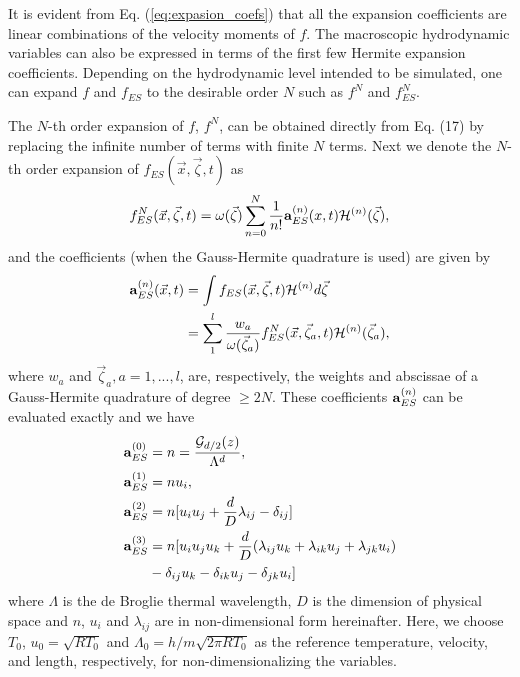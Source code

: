 \documentclass[doublecol]{epl2}
\begin{document}
It is evident from Eq. (\ref{eq:expasion_coefs}) that all the expansion coefficients are linear combinations of the velocity moments of $f$.  The macroscopic hydrodynamic variables can also be expressed in terms of the first few Hermite expansion coefficients.  Depending on the hydrodynamic level intended to be simulated, one can expand $f$ and $f_{ES}$ to the desirable order $N$ such as $f^N$ and $f_{ES}^N$.

The $N$-th order expansion of $f$, $f^N$, can be obtained directly from Eq. (17) by replacing the infinite number of terms with finite $N$ terms.  Next we denote the $N$-th order expansion of $f_{ES}(\vec x,\vec\zeta ,t)$ as
\begin{align}
 f^N_{ES}(\vec x,\vec\zeta ,t) =\omega (\vec\zeta )\sum _{n=0}^N
\frac{1}{n!} {\bf a}^{(n)}_{ES}(x,t) {{\mathcal H}}^{(n)} (\vec\zeta ),
\end{align}
and the coefficients (when the Gauss-Hermite quadrature is used) are given by
\begin{align}
{\bf a}^{(n)}_{ES} (\vec x,t) &=\int f_{ES}(\vec x,\vec\zeta ,t) {{\mathcal H}}^{(n)} d\vec\zeta \nonumber \\
&= \sum_1^l \frac{w_a}{\omega (\vec\zeta_a )} f^N_{ES}(\vec x,\vec \zeta_a ,t) {{\mathcal H}}^{(n)} (\vec\zeta_a ),
\end{align}
where $w_a$ and $\vec \zeta_a, a=1,...,l$, are, respectively, the weights and abscissae of a Gauss-Hermite quadrature of degree $ \ge 2N$.
These coefficients ${\bf a}^{(n)}_{ES}$ can be evaluated exactly and we have
\begin{subequations}
\begin{align}
{\bf a}_{ES}^{(0)} &= n = \frac{ \mathcal{G}_{d/2}(z)}{\Lambda^d}, \\
{\bf a}_{ES}^{(1)} &= n u_{i},  \\
{\bf a}_{ES}^{(2)} &= n [u_{i} u_{j} + \frac{d}{D} \lambda_{i j} - \delta_{i j}] \\
{\bf a}_{ES}^{(3)} &= n [u_{i} u_{j} u_{k} + \frac{d}{D}(\lambda_{i j} u_{k} + \lambda_{i k} u_{j} + \lambda_{j k} u_{i}) \nonumber \\																				 & - \delta_{i j} u_{k}  - \delta_{i k} u_{j}  - \delta_{j k} u_{i} ]
\end{align}
\end{subequations}
where $\Lambda$ is the de Broglie thermal wavelength, $D$ is the dimension of physical space and $n$, $u_{i}$ and $\lambda_{i j}$ are in non-dimensional form hereinafter. Here, we choose $T_0$, $u_0=\sqrt{ RT_0}$ and $\Lambda_0=h/m\sqrt{2\pi RT_0}$ as the reference temperature, velocity, and length, respectively, for non-dimensionalizing the variables.
\end{document}
